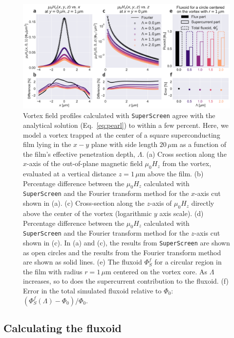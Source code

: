 \documentclass[final,3p,times]{elsarticle}
\newcommand{\inline}[1]{\texttt{#1}\xspace}
\newcommand{\SuperScreen}{\inline{SuperScreen}}
\begin{document}
\begin{figure}[h]
    \centering
    \includegraphics[width=\textwidth]{examples/images/pearl.pdf}
    \caption{Vortex field profiles calculated with \SuperScreen agree with the analytical solution (Eq.~\ref{eq:pearl}) to within a few percent. Here, we model a vortex trapped at the center of a square superconducting film lying in the $x-y$ plane with side length $20\,\mu\mathrm{m}$ as a function of the film's effective penetration depth, $\Lambda$. (a) Cross section along the $x$-axis of the out-of-plane magnetic field $\mu_0H_z$ from the vortex, evaluated at a vertical distance $z=1\,\mu\mathrm{m}$ above the film. (b) Percentage difference between the $\mu_0H_z$ calculated with \SuperScreen and the Fourier transform method for the $x$-axis cut shown in (a). (c) Cross-section along the $z$-axis of $\mu_0H_z$ directly above the center of the vortex (logarithmic $y$ axis scale). (d) Percentage difference between the $\mu_0H_z$ calculated with \SuperScreen and the Fourier transform method for the $z$-axis cut shown in (c). In (a) and (c), the results from \SuperScreen are shown as open circles and the results from the Fourier transform method are shown as solid lines. (e) The fluxoid $\Phi_S^f$ for a circular region in the film with radius $r=1\,\mu\mathrm{m}$ centered on the vortex core. As $\Lambda$ increases, so to does the supercurrent contribution to the fluxoid. (f) Error in the total simulated fluxoid relative to $\Phi_0$: $(\Phi_S^f(\Lambda) - \Phi_0) / \Phi_0$.}
    \label{fig:pearl}
\end{figure}

\subsection{Calculating the fluxoid}
\label{section:examples:fluxoid}
\end{document}
